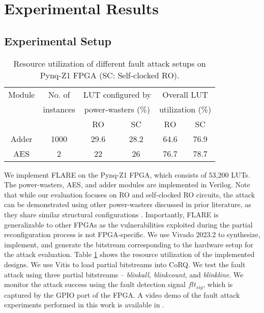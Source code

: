 \section{Experimental Results}
\subsection{Experimental Setup}
\vspace{-0.1cm}
\begin{table}[t]
\centering
\caption{Resource utilization of different fault attack setups on Pynq-Z1 FPGA (SC: Self-clocked RO).}
\fontsize{8.2}{8.2}\selectfont

\begin{tabular}{|c |c |c|c|c|c|} 
\cline{1-6}
{Module}&No. of &\multicolumn{2}{c|}{LUT configured by  }&\multicolumn{2}{c|}{Overall LUT } \\ 

&instances&\multicolumn{2}{c|}{power-wasters (\%)}& \multicolumn{2}{c|}{utilization (\%)}\\
\cline{3-6}
&&RO&SC &RO&SC  \\
\hline
Adder&1000&29.6&28.2&64.6&76.9 \\
\hline
AES&2&22&26&76.7 &78.7\\
\hline






\end{tabular}
 \vspace{-0.2cm}
 \label{lut}

\end{table}



We implement FLARE on the Pynq-Z1 FPGA, which consists of 53,200 LUTs. The power-wasters, AES, and adder modules are implemented in Verilog. Note that while our evaluation focuses on RO and self-clocked RO circuits, the attack can be demonstrated using other power-wasters discussed in prior literature, as they share similar structural configurations \cite{FPGAhammer} \cite{Krautter2019MitigatingCloud} \cite{9810438}. Importantly, FLARE is generalizable to other FPGAs as the vulnerabilities exploited during the partial reconfiguration process is not FPGA-specific. We use Vivado 2023.2 to synthesize, implement, and generate the bitstream corresponding to the hardware setup for the attack evaluation. Table \ref{lut} shows the resource utilization of the implemented designs. We use Vitis to load partial bitstreams into CoRQ.  We test the fault attack using three partial bitstreams -- \textit{blinkall, blinkcount}, and \textit{blinkline}. We monitor the attack success using the fault detection signal $flt_{sig}$, which is captured by the GPIO port of the FPGA. A video demo of the fault attack experiments performed in this work is available in \cite{demo}.

